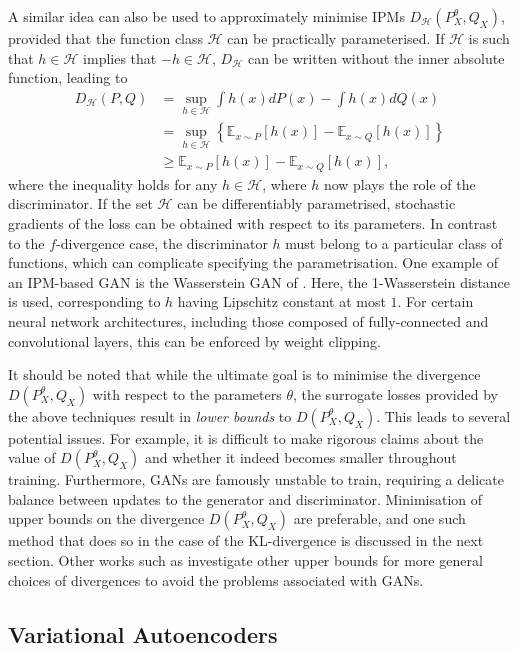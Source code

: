 A similar idea can also be used to approximately minimise IPMs $D_\mathcal{H}(P^\theta_X, Q_X)$, provided that the function class $\mathcal{H}$ can be practically parameterised.
If $\mathcal{H}$ is such that $h \in \mathcal{H}$ implies that $-h \in \mathcal{H}$, $D_\mathcal{H}$ can be written without the inner absolute function, leading to
%
\begin{align*}
D_{\mathcal{H}}(P, Q) &= \sup_{h\in\mathcal{H}} \int h(x) dP(x) - \int h(x) dQ(x) \\
&= \sup_{h\in\mathcal{H}} \left\{ \mathbb{E}_{x \sim P} \left[ h(x) \right]- \mathbb{E}_{x \sim Q} \left[ h(x) \right] \right\} \\
&\geq  \mathbb{E}_{x \sim P} \left[ h(x) \right]- \mathbb{E}_{x \sim Q} \left[ h(x) \right],
\end{align*}
%
where the inequality holds for any $h \in \mathcal{H}$, where $h$ now plays the role of the discriminator. 
If the set $\mathcal{H}$ can be differentiably parametrised, stochastic gradients of the loss can be obtained with respect to its parameters.
In contrast to the $f$-divergence case, the discriminator $h$ must belong to a particular class of functions, which can complicate specifying the parametrisation.
One example of an IPM-based GAN is the Wasserstein GAN of \cite{AB17}. 
Here, the 1-Wasserstein distance is used, corresponding to $h$ having Lipschitz constant at most $1$. 
For certain neural network architectures, including those composed of fully-connected and convolutional layers, this can be enforced by weight clipping.

It should be noted that while the ultimate goal is to minimise the divergence $D(P_X^\theta, Q_X)$ with respect to the parameters $\theta$, the surrogate losses provided by the above techniques result in \emph{lower bounds} to $D(P_X^\theta, Q_X)$. 
This leads to several potential issues.
For example, it is difficult to make rigorous claims about the value of $D(P_X^\theta, Q_X)$ and whether it indeed becomes smaller throughout training.
Furthermore, GANs are famously unstable to train, requiring a delicate balance between updates to the generator and discriminator. 
Minimisation of upper bounds on the divergence $D(P_X^\theta, Q_X)$ are preferable, and one such method that does so in the case of the KL-divergence is discussed in the next section. 
Other works such as \cite{zhang2019variational} investigate other upper bounds for more general choices of divergences to avoid the problems associated with GANs.

\subsection{Variational Autoencoders}

